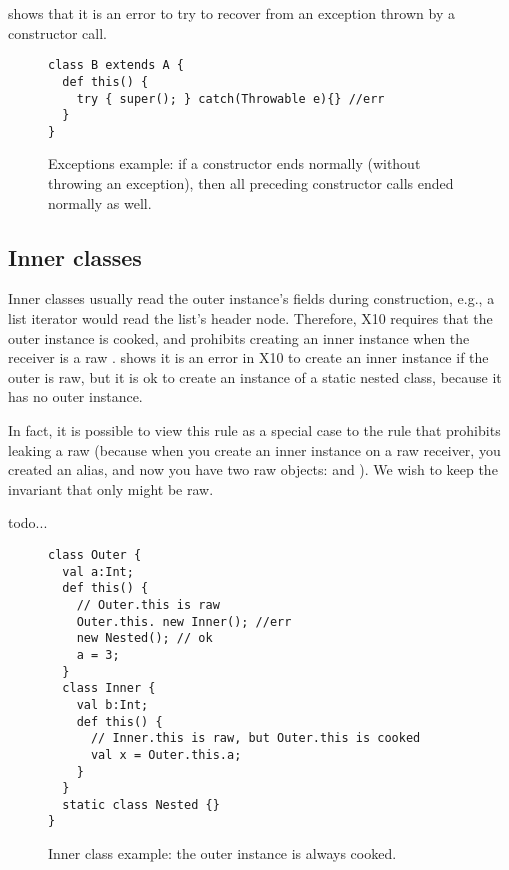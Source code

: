  shows that it is an error to try to recover from an exception thrown
    by a constructor call.
\begin{figure}
\begin{lstlisting}
class B extends A {
  def this() {
    try { super(); } catch(Throwable e){} //err
  }
}
\end{lstlisting}
\caption{Exceptions example:
    if a constructor ends normally (without throwing an exception),
        then all preceding constructor calls ended normally as well.
    }
\label{Figure:Exceptions}
\end{figure}



\subsection{Inner classes}
Inner classes usually read the outer instance's fields during construction,
    e.g., a list iterator would read the list's header node.
Therefore, X10 requires that the outer instance is cooked,
    and prohibits creating an inner instance when the receiver is a raw \this.
 shows it is an error in X10 to create an inner instance
    if the outer is raw,
    but it is ok to create an instance of a static nested class,
    because it has no outer instance.

In fact, it is possible to view this rule as a special case to the rule that
    prohibits leaking a raw \this
    (because when you create an inner instance on a raw \this receiver,
    you created an alias,
    and now you have two raw objects:  and ).
We wish to keep the invariant that only \this might be raw.

 todo...

\begin{figure}
\begin{lstlisting}
class Outer {
  val a:Int;
  def this() {
    // Outer.this is raw
    Outer.this. new Inner(); //err
    new Nested(); // ok
    a = 3;
  }
  class Inner {
    val b:Int;
    def this() {
      // Inner.this is raw, but Outer.this is cooked
      val x = Outer.this.a;
    }
  }
  static class Nested {}
}
\end{lstlisting}
\caption{Inner class example: the outer instance is always cooked.
    }
\label{Figure:InnerClass}
\end{figure}


